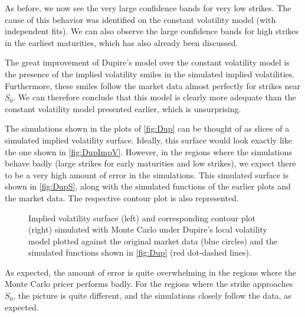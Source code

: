 As before, we now see the very large confidence bands for very low strikes. The cause of this behavior was identified on the constant volatility model (with independent fits). We can also observe the large confidence bands for high strikes in the earliest maturities, which has also already been discussed.

The great improvement of Dupire's model over the constant volatility model is the presence of the implied volatility smiles in the simulated implied volatilities. Furthermore, these smiles follow the market data almost perfectly for strikes near $S_0$.
We can therefore conclude that this model is clearly more adequate than the constant volatility model presented earlier, which is unsurprising.

The simulations shown in the plots of \autoref{fig:Dup} can be thought of as slices of a simulated implied volatility surface. Ideally, this surface would look exactly like the one shown in \autoref{fig:DupImpV}. However, in the regions where the simulations behave badly (large strikes for early maturities and low strikes), we expect there to be a very high amount of error in the simulations. This simulated surface is shown in \autoref{fig:DupS}, along with the simulated functions of the earlier plots and the market data. The respective contour plot is also represented.

\vfill
\newpage

\begin{figure}[H]
  \begin{subfigmatrix}{2}
  \end{subfigmatrix}
    \caption[Implied volatility surface and corresponding contour plot simulated with Monte Carlo under Dupire's local volatility model plotted against the original market data and the simulated functions shown in \autoref{fig:Dup}.]{Implied volatility surface (left) and corresponding contour plot (right) simulated with Monte Carlo under Dupire's local volatility model plotted against the original market data (blue circles) and the simulated functions shown in \autoref{fig:Dup} (red dot-dashed lines).}\label{fig:DupS}
\end{figure}   


As expected, the amount of error is quite overwhelming in the regions where the Monte Carlo pricer performs badly. For the regions where the strike approaches $S_0$, the picture is quite different, and the simulations closely follow the data, as expected.

